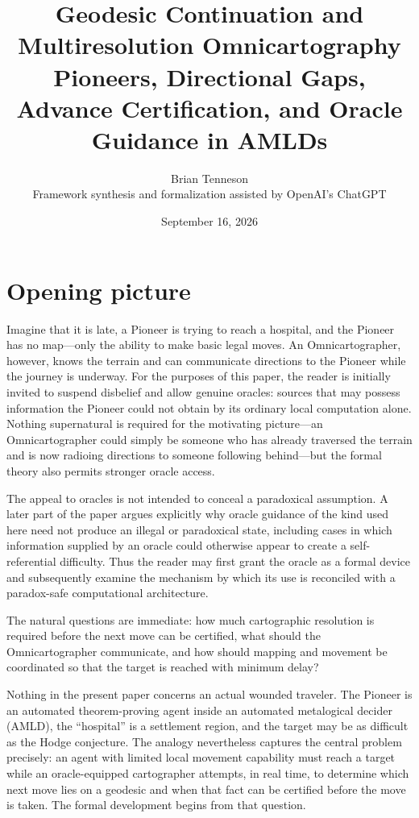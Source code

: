 \documentclass[11pt]{article}
\title{\textbf{Geodesic Continuation and Multiresolution Omnicartography}\\
\large Pioneers, Directional Gaps, Advance Certification, and Oracle Guidance in AMLDs}
\author{Brian Tenneson\\Framework synthesis and formalization assisted by OpenAI's ChatGPT}
\date{September 16, 2026}
\theoremstyle{definition}
\theoremstyle{remark}
\begin{document}
\maketitle

\section*{Opening picture}
Imagine that it is late, a Pioneer is trying to reach a hospital, and the Pioneer has no map---only the ability to make basic legal moves. An Omnicartographer, however, knows the terrain and can communicate directions to the Pioneer while the journey is underway. For the purposes of this paper, the reader is initially invited to suspend disbelief and allow genuine oracles: sources that may possess information the Pioneer could not obtain by its ordinary local computation alone. Nothing supernatural is required for the motivating picture---an Omnicartographer could simply be someone who has already traversed the terrain and is now radioing directions to someone following behind---but the formal theory also permits stronger oracle access.

The appeal to oracles is not intended to conceal a paradoxical assumption. A later part of the paper argues explicitly why oracle guidance of the kind used here need not produce an illegal or paradoxical state, including cases in which information supplied by an oracle could otherwise appear to create a self-referential difficulty. Thus the reader may first grant the oracle as a formal device and subsequently examine the mechanism by which its use is reconciled with a paradox-safe computational architecture.

The natural questions are immediate: how much cartographic resolution is required before the next move can be certified, what should the Omnicartographer communicate, and how should mapping and movement be coordinated so that the target is reached with minimum delay?

Nothing in the present paper concerns an actual wounded traveler. The Pioneer is an automated theorem-proving agent inside an automated metalogical decider (AMLD), the ``hospital'' is a settlement region, and the target may be as difficult as the Hodge conjecture. The analogy nevertheless captures the central problem precisely: an agent with limited local movement capability must reach a target while an oracle-equipped cartographer attempts, in real time, to determine which next move lies on a geodesic and when that fact can be certified before the move is taken. The formal development begins from that question.
\end{document}
